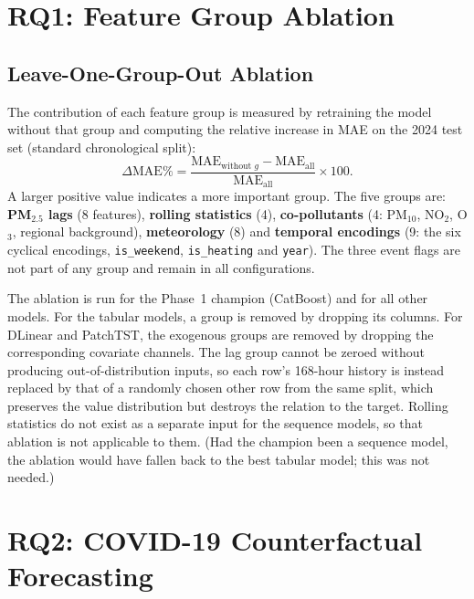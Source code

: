 \section{RQ1: Feature Group Ablation}
\label{section:RQ1}

\subsection{Leave-One-Group-Out Ablation}
\label{subsection:logo-ablation}
The contribution of each feature group is measured by retraining the model without that group and computing the relative increase in MAE on the 2024 test set (standard chronological split):
\begin{equation}
    \Delta\text{MAE}\% = \frac{\text{MAE}_{\text{without } g} - \text{MAE}_{\text{all}}}{\text{MAE}_{\text{all}}} \times 100 .
\end{equation}
A larger positive value indicates a more important group. The five groups are: \textbf{PM$_{2.5}$ lags} (8 features), \textbf{rolling statistics} (4), \textbf{co-pollutants} (4: PM$_{10}$, NO$_2$, O$_3$, regional background), \textbf{meteorology} (8) and \textbf{temporal encodings} (9: the six cyclical encodings, \texttt{is\_weekend}, \texttt{is\_heating} and \texttt{year}). The three event flags are not part of any group and remain in all configurations.

The ablation is run for the Phase~1 champion (CatBoost) and for all other models. For the tabular models, a group is removed by dropping its columns. For DLinear and PatchTST, the exogenous groups are removed by dropping the corresponding covariate channels. The lag group cannot be zeroed without producing out-of-distribution inputs, so each row's 168-hour history is instead replaced by that of a randomly chosen other row from the same split, which preserves the value distribution but destroys the relation to the target. Rolling statistics do not exist as a separate input for the sequence models, so that ablation is not applicable to them. (Had the champion been a sequence model, the ablation would have fallen back to the best tabular model; this was not needed.)

\section{RQ2: COVID-19 Counterfactual Forecasting}
\label{section:RQ2}

